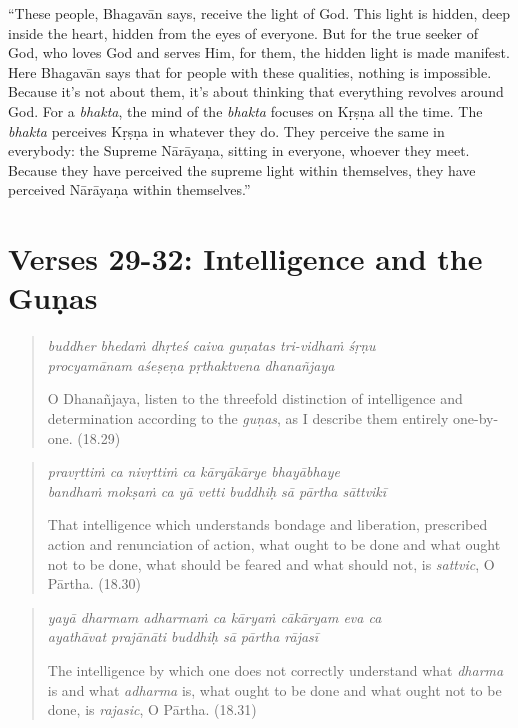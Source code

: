 \documentclass[12pt, twoside, openright]{memoir}
\begin{document}
\enquote{These people, Bhagavān says, receive the light of God. This light is hidden, deep inside the heart, hidden from the eyes of everyone. But for the true seeker of God, who loves God and serves Him, for them, the hidden light is made manifest. Here Bhagavān says that for people with these qualities, nothing is impossible. Because it’s not about them, it’s about thinking that everything revolves around God. For a \textit{bhakta}, the mind of the \textit{bhakta} focuses on Kṛṣṇa all the time. The \textit{bhakta} perceives Kṛṣṇa in whatever they do. They perceive the same in everybody: the Supreme Nārāyaṇa, sitting in everyone, whoever they meet. Because they have perceived the supreme light within themselves, they have perceived Nārāyaṇa within themselves.}

\newpage

\section{Verses 29-32: Intelligence and the Guṇas}\label{sec-verses-29-32-intelligence-and-the-gunas}


\par
\begin{verse}
\textit{buddher bhedaṁ dhṛteś caiva guṇatas tri-vidhaṁ śṛṇu} \\
\textit{procyamānam aśeṣeṇa pṛthaktvena dhanañjaya}

\noindent O Dhanañjaya, listen to the threefold distinction of intelligence and determination according to the \textit{guṇas}, as I describe them entirely one-by-one. (18.29)
\end{verse}
\par



\par
\begin{verse}
\textit{pravṛttiṁ ca nivṛttiṁ ca kāryākārye bhayābhaye} \\
\textit{bandhaṁ mokṣaṁ ca yā vetti buddhiḥ sā pārtha sāttvikī}

\noindent That intelligence which understands bondage and liberation, prescribed action and renunciation of action, what ought to be done and what ought not to be done, what should be feared and what should not, is \textit{sattvic}, O Pārtha. (18.30)
\end{verse}
\par



\par
\begin{verse}
\textit{yayā dharmam adharmaṁ ca kāryaṁ cākāryam eva ca} \\
\textit{ayathāvat prajānāti buddhiḥ sā pārtha rājasī}

\noindent The intelligence by which one does not correctly understand what \textit{dharma} is and what \textit{adharma} is, what ought to be done and what ought not to be done, is \textit{rajasic}, O Pārtha. (18.31)
\end{verse}
\par
\end{document}
